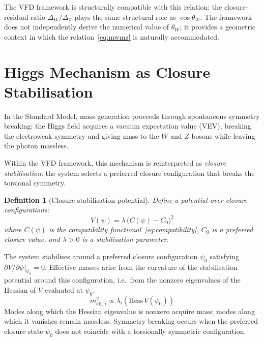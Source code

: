 \documentclass[12pt]{article}
\newtheorem{definition}[theorem]{Definition}
\begin{document}
The VFD framework is structurally compatible with this relation: the closure-residual ratio $\Delta_W/\Delta_Z$ plays the same structural role as $\cos\theta_W$. The framework does not independently derive the numerical value of $\theta_W$; it provides a geometric context in which the relation~\eqref{eq:mwmz} is naturally accommodated.

\section{Higgs Mechanism as Closure Stabilisation}\label{sec:higgs}

In the Standard Model, mass generation proceeds through spontaneous symmetry breaking: the Higgs field acquires a vacuum expectation value (VEV), breaking the electroweak symmetry and giving mass to the $W$ and $Z$ bosons while leaving the photon massless.

Within the VFD framework, this mechanism is reinterpreted as \textit{closure stabilisation}: the system selects a preferred closure configuration that breaks the torsional symmetry.

\begin{definition}[Closure stabilisation potential]\label{def:potential}
Define a potential over closure configurations:
\begin{equation}\label{eq:potential}
    V(\psi) = \lambda\, \big(C(\psi) - C_0\big)^2
\end{equation}
where $C(\psi)$ is the compatibility functional~\eqref{eq:compatibility}, $C_0$ is a preferred closure value, and $\lambda > 0$ is a stabilisation parameter.
\end{definition}

The system stabilises around a preferred closure configuration $\psi_0$ satisfying $\partial V / \partial\psi\big|_{\psi_0} = 0$. Effective masses arise from the curvature of the stabilisation potential around this configuration, i.e.\ from the nonzero eigenvalues of the Hessian of $V$ evaluated at $\psi_0$:
\begin{equation}
    m_{\mathrm{eff},\,i}^2 \propto \lambda_i\!\left(\mathrm{Hess}\, V(\psi_0)\right)
\end{equation}
Modes along which the Hessian eigenvalue is nonzero acquire mass; modes along which it vanishes remain massless. Symmetry breaking occurs when the preferred closure state $\psi_0$ does not coincide with a torsionally symmetric configuration.
\end{document}
